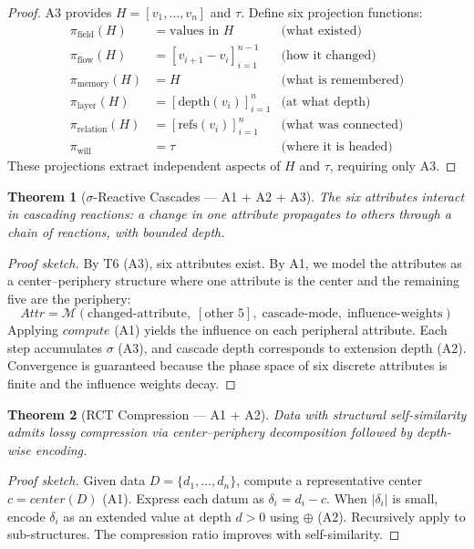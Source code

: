 \documentclass[11pt,a4paper]{article}
\newtheorem{theorem}{Theorem}[section]
\newcommand{\MDim}{\mathcal{M}}
\newcommand{\extop}{\oplus}
\begin{document}
\begin{proof}
A3 provides $H = [v_1, \ldots, v_n]$ and $\tau$. Define six projection functions:
\begin{align*}
  \pi_{\text{field}}(H) &= \text{values in } H & \text{(what existed)} \\
  \pi_{\text{flow}}(H) &= [v_{i+1} - v_i]_{i=1}^{n-1} & \text{(how it changed)} \\
  \pi_{\text{memory}}(H) &= H & \text{(what is remembered)} \\
  \pi_{\text{layer}}(H) &= [\text{depth}(v_i)]_{i=1}^{n} & \text{(at what depth)} \\
  \pi_{\text{relation}}(H) &= [\text{refs}(v_i)]_{i=1}^{n} & \text{(what was connected)} \\
  \pi_{\text{will}} &= \tau & \text{(where it is headed)}
\end{align*}
These projections extract independent aspects of $H$ and $\tau$, requiring only A3.
\end{proof}

\begin{theorem}[$\sigma$-Reactive Cascades --- A1 + A2 + A3]
\label{thm:cascade}
The six attributes interact in cascading reactions: a change in one attribute propagates to others through a chain of reactions, with bounded depth.
\end{theorem}

\begin{proof}[Proof sketch]
By T6 (A3), six attributes exist. By A1, we model the attributes as a center--periphery structure where one attribute is the center and the remaining five are the periphery:
\[
  \textit{Attr} = \MDim(\text{changed-attribute},\; [\text{other 5}],\; \text{cascade-mode},\; \text{influence-weights})
\]
Applying $\textit{compute}$ (A1) yields the influence on each peripheral attribute. Each step accumulates $\sigma$ (A3), and cascade depth corresponds to extension depth (A2). Convergence is guaranteed because the phase space of six discrete attributes is finite and the influence weights decay.
\end{proof}

\begin{theorem}[RCT Compression --- A1 + A2]
\label{thm:rct}
Data with structural self-similarity admits lossy compression via center--periphery decomposition followed by depth-wise encoding.
\end{theorem}

\begin{proof}[Proof sketch]
Given data $D = \{d_1, \ldots, d_n\}$, compute a representative center $c = \textit{center}(D)$ (A1). Express each datum as $\delta_i = d_i - c$. When $|\delta_i|$ is small, encode $\delta_i$ as an extended value at depth $d > 0$ using $\extop$ (A2). Recursively apply to sub-structures. The compression ratio improves with self-similarity.
\end{proof}
\end{document}
